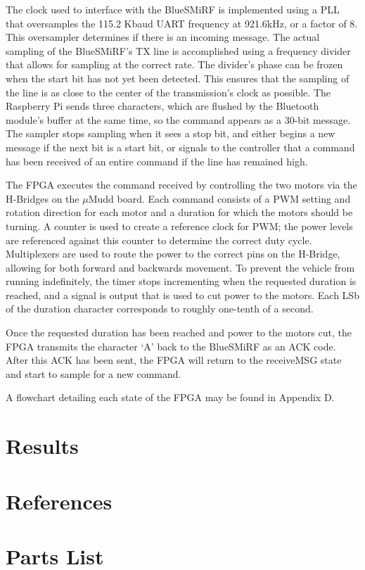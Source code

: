\documentclass[12pt]{article}
\begin{document}
The clock used to interface with the BlueSMiRF is implemented using a PLL that oversamples the 115.2 Kbaud UART frequency at 921.6kHz, or a factor of 8.  This oversampler determines if there is an incoming message.  The actual sampling of the BlueSMiRF's TX line is accomplished using a frequency divider that allows for sampling at the correct rate.  The divider's phase can be frozen when the start bit has not yet been detected.  This ensures that the sampling of the line is as close to the center of the transmission's clock as possible.  The Raspberry Pi sends three characters, which are flushed by the Bluetooth module's buffer at the same time, so the command appears as a 30-bit message.  The sampler stops sampling when it sees a stop bit, and either begins a new message if the next bit is a start bit, or signals to the controller that a command has been received of an entire command if the line has remained high.

The FPGA executes the command received by controlling the two motors via the H-Bridges on the $\mu$Mudd board. Each command consists of a PWM setting and rotation direction for each motor and a duration for which the motors should be turning.  A counter is used to create a reference clock for PWM; the power levels are referenced against this counter to determine the correct duty cycle.  Multiplexers are used to route the power to the correct pins on the H-Bridge, allowing for both forward and backwards movement.  To prevent the vehicle from running indefinitely, the timer stops incrementing when the requested duration is reached, and a signal is output that is used to cut power to the motors.  Each LSb of the duration character corresponds to roughly one-tenth of a second.

Once the requested duration has been reached and power to the motors cut, the FPGA transmits the character `A' back to the BlueSMiRF as an ACK code.  After this ACK has been sent, the FPGA will return to the receiveMSG state and start to sample for a new command.

A flowchart detailing each state of the FPGA may be found in Appendix D.

\section{Results}
\section{References}
\section{Parts List}
\end{document}
